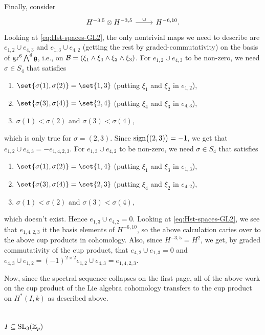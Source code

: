 Finally, consider
\[
  \begin{tikzcd}
    H^{-3,5} \otimes H^{-3,5} \ar[r,"\cup"] & H^{-6,10}.
  \end{tikzcd}
\]
Looking at \eqref{eq:Hst-spaces-GL2}, the only nontrivial maps we need to describe are $e_{1,2} \cup e_{4,3}$ and $e_{1,3} \cup e_{4,2}$ (getting the rest by graded-commutativity) on the basis of $\operatorname{gr}^{6} \bigwedge^{4}\mathfrak{g}$, i.e., on $\mathcal{B} = (\xi_{1} \wedge \xi_{4} \wedge \xi_{2} \wedge \xi_{3})$.  For $e_{1,2} \cup e_{4,3}$ to be non-zero, we need $\sigma \in S_{4}$ that satisfies
\begin{enumerate}[$\bullet$]
  \item $\set{\sigma(1),\sigma(2)} = \set{1,3}$ (putting $\xi_{1}$ and $\xi_{2}$ in $e_{1,2}$),
  \item $\set{\sigma(3),\sigma(4)} = \set{2,4}$ (putting $\xi_{4}$ and $\xi_{3}$ in $e_{4,3}$),
  \item $\sigma(1) < \sigma(2)$ and $\sigma(3) < \sigma(4)$,
\end{enumerate}
which is only true for $\sigma = (2,3)$. Since $\operatorname{sign}\bigl((2,3)\bigr) = -1$, we get that $e_{1,2} \cup e_{4,3} = -e_{1,4,2,3}$. For $e_{1,3} \cup e_{4,2}$ to be non-zero, we need $\sigma \in S_{4}$ that satisfies
\begin{enumerate}[$\bullet$]
  \item $\set{\sigma(1),\sigma(2)} = \set{1,4}$ (putting $\xi_{1}$ and $\xi_{3}$ in $e_{1,3}$),
  \item $\set{\sigma(3),\sigma(4)} = \set{2,3}$ (putting $\xi_{4}$ and $\xi_{2}$ in $e_{4,2}$),
  \item $\sigma(1) < \sigma(2)$ and $\sigma(3) < \sigma(4)$,
\end{enumerate}
which doesn't exist. Hence $e_{1,3} \cup e_{4,2} = 0$. Looking at \eqref{eq:Hst-spaces-GL2}, we see that $e_{1,4,2,3}$ it the basis elements of $H^{-6,10}$, so the above calculation caries over to the above cup products in cohomology. Also, since $H^{-3,5} = H^{2}$, we get, by graded commutativity of the cup product, that $e_{4,2} \cup e_{1,3} = 0$ and $e_{4,3} \cup e_{1,2} = (-1)^{2\times2} e_{1,2} \cup e_{4,3} = e_{1,4,2,3}$.

Now, since the spectral sequence collapses on the first page, all of the above work on the cup product of the Lie algebra cohomology transfers to the cup product on $H^{*}(I,k)$ as described above.

\section{\texorpdfstring{$I \subseteq \operatorname{SL}_{3}(\mathbb{Z}_{p})$}{I in SL3(Zp)}}%
\label{sec:Iwa-SL3}

